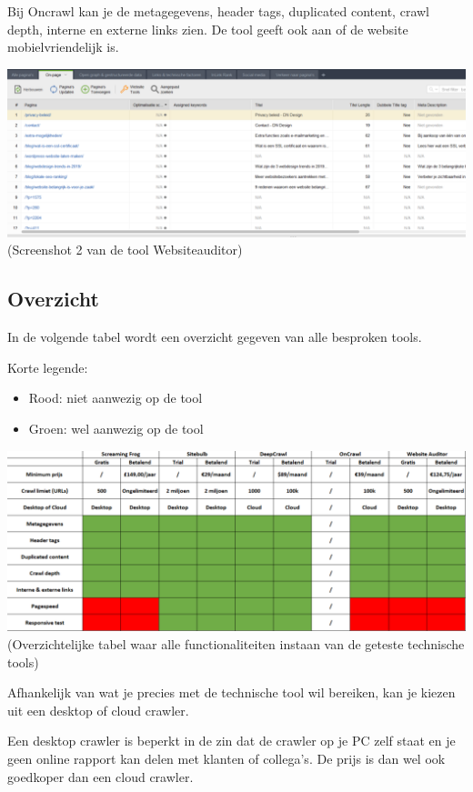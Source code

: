 Bij Oncrawl kan je de metagegevens, header tags, duplicated content, crawl depth, interne en externe links zien. De tool geeft ook aan of de website mobielvriendelijk is.

\includegraphics[width=\linewidth]{Bachelorproef/bachelor/img/websiteauditor1.PNG}
(Screenshot 2 van de tool Websiteauditor)

\subsection{Overzicht}
\label{ch: Overzicht}

In de volgende tabel wordt een overzicht gegeven van alle besproken tools. 

Korte legende: 
\begin{itemize}
\item Rood: niet aanwezig op de tool
\item Groen: wel aanwezig op de tool
\end{itemize}

\includegraphics[width=\linewidth]{Bachelorproef/bachelor/img/Knipsel.PNG}
(Overzichtelijke tabel waar alle functionaliteiten instaan van de geteste technische tools)

Afhankelijk van wat je precies met de technische tool wil bereiken, kan je kiezen uit een desktop of cloud crawler. 

Een desktop crawler is beperkt in de zin dat de crawler op je PC zelf staat en je geen online rapport kan delen met klanten of collega's. De prijs is dan wel ook goedkoper dan een cloud crawler. 


